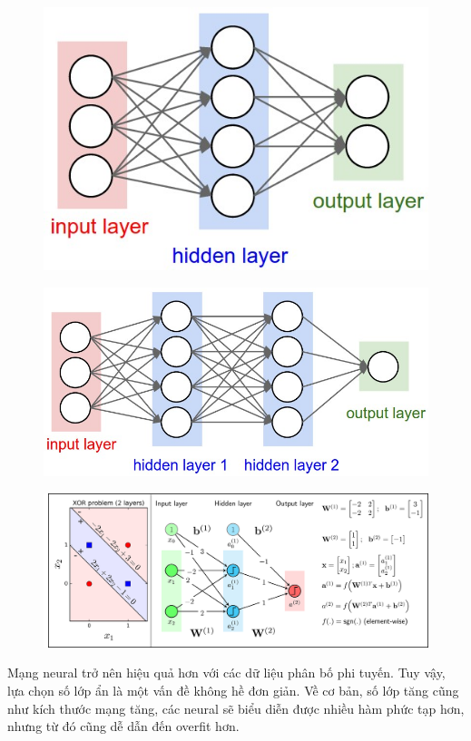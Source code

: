 \begin{center}
    \begin{figure}[H]
    \centering
    \includegraphics[width=0.5\columnwidth]{images/chap2/2layer.jpeg}
    \label{fig:my_label}
    \end{figure}
\end{center}
\begin{center}
    \begin{figure}[H]
    \centering
    \includegraphics[width=0.6\columnwidth]{images/chap2/3layer.jpeg}
    \label{fig:my_label}
    \end{figure}
\end{center}


\begin{center}
    \begin{figure}[H]
    \centering
    \includegraphics[width=1\columnwidth]{images/chap2/xor_nn.png}
    \label{fig:my_label}
    \end{figure}
\end{center}
Mạng neural trở nên hiệu quả hơn với các dữ liệu phân bố phi tuyến. Tuy vậy, lựa chọn số lớp ẩn là một vấn đề không hề đơn giản. Về cơ bản, số lớp tăng cũng như kích thước mạng tăng, các neural sẽ biểu diễn được nhiều hàm phức tạp hơn, nhưng từ đó cũng dễ dẫn đến overfit hơn. 

